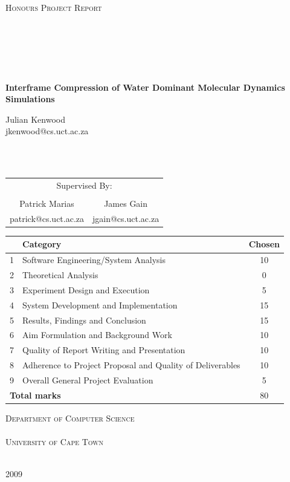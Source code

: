 \documentclass[a4paper,11pt]{report}
\begin{document}
\pagestyle{empty}

\begin{titlepage}
\begin{center}

\textsc{\Large Honours Project Report \\
\ \\
\ \\
\ \\
\ \\
\ \\
}

{\huge \bfseries
Interframe Compression of Water Dominant Molecular Dynamics Simulations 
\\}

\vfill

\large Julian Kenwood
\\
\small{jkenwood@cs.uct.ac.za}

\ \\
\ \\

\begin{tabular}{cc}
  \multicolumn{2}{c}{\large Supervised By:} \\
  \\ 
  \large Patrick Marias & \large James Gain
  \\
  \small patrick@cs.uct.ac.za & \small jgain@cs.uct.ac.za
\end{tabular}

\vfill

\begin{tabular}{|l|l|c|}
  \hline
  & \textbf{Category} & \textbf{Chosen} \\
  \hline
  1 & Software Engineering/System Analysis & 10 \\
  \hline
  2 & Theoretical Analysis & 0 \\
  \hline
  3 & Experiment Design and Execution & 5 \\
  \hline
  4 & System Development and Implementation & 15 \\
  \hline
  5 & Results, Findings and Conclusion & 15 \\
  \hline
  6 & Aim Formulation and Background Work & 10 \\
  \hline
  7 & Quality of Report Writing and Presentation & 10 \\
  \hline
  8 & Adherence to Project Proposal and Quality of Deliverables & 10 \\
  \hline
  9 & Overall General Project Evaluation & 5 \\
  \hline
  \multicolumn{2}{|l|}{\textbf{Total marks}} & 80 \\
  \hline
\end{tabular}

\vfill

\textsc{\Large Department of Computer Science \\
\ \\
University of Cape Town \\
\ \\}

{\large 2009}

\end{center}
\end{titlepage}
\end{document}
